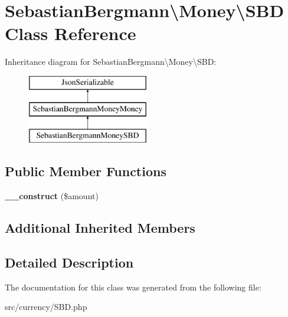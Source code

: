 \hypertarget{classSebastianBergmann_1_1Money_1_1SBD}{}\section{Sebastian\+Bergmann\textbackslash{}Money\textbackslash{}S\+B\+D Class Reference}
\label{classSebastianBergmann_1_1Money_1_1SBD}
Inheritance diagram for Sebastian\+Bergmann\textbackslash{}Money\textbackslash{}S\+B\+D\+:\begin{figure}[H]
\begin{center}
\leavevmode
\includegraphics[height=3.000000cm]{classSebastianBergmann_1_1Money_1_1SBD}
\end{center}
\end{figure}
\subsection*{Public Member Functions}
\begin{DoxyCompactItemize}
\item 
\hypertarget{classSebastianBergmann_1_1Money_1_1SBD_a863fa8949b0c49e4e4f079ff56e8b523}{}{\bfseries \+\_\+\+\_\+construct} (\$amount)\label{classSebastianBergmann_1_1Money_1_1SBD_a863fa8949b0c49e4e4f079ff56e8b523}

\end{DoxyCompactItemize}
\subsection*{Additional Inherited Members}


\subsection{Detailed Description}


The documentation for this class was generated from the following file\+:\begin{DoxyCompactItemize}
\item 
src/currency/S\+B\+D.\+php\end{DoxyCompactItemize}
